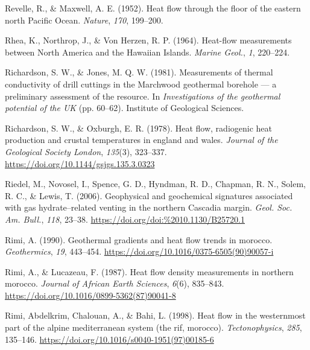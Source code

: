 \documentclass[draft,linenumbers]{agujournal2018}
\begin{document}
\leavevmode{}%
Revelle, R., \& Maxwell, A. E. (1952). Heat flow through the floor of
the eastern north {Pacific Ocean}. \emph{Nature}, \emph{170}, 199--200.

\leavevmode{}%
Rhea, K., Northrop, J., \& Von Herzen, R. P. (1964). Heat-flow
measurements between {North America and the Hawaiian Islands}.
\emph{Marine Geol.}, \emph{1}, 220--224.

\leavevmode{}%
Richardson, S. W., \& Jones, M. Q. W. (1981). Measurements of thermal
conductivity of drill cuttings in the {Marchwood} geothermal borehole
--- a preliminary assessment of the resource. In \emph{Investigations of
the geothermal potential of the UK} (pp. 60--62). Institute of
Geological Sciences.

\leavevmode{}%
Richardson, S. W., \& Oxburgh, E. R. (1978). Heat flow, radiogenic heat
production and crustal temperatures in england and wales. \emph{Journal
of the Geological Society London}, \emph{135}(3), 323--337.
\url{https://doi.org/10.1144/gsjgs.135.3.0323}

\leavevmode{}%
Riedel, M., Novosel, I., Spence, G. D., Hyndman, R. D., Chapman, R. N.,
Solem, R. C., \& Lewis, T. (2006). Geophysical and geochemical
signatures associated with gas {hydrate--related} venting in the
northern {Cascadia} margin. \emph{Geol. Soc. Am. Bull.}, \emph{118},
23--38. \url{https://doi.org/doi:\%2010.1130/B25720.1}

\leavevmode{}%
Rimi, A. (1990). Geothermal gradients and heat flow trends in morocco.
\emph{Geothermics}, \emph{19}, 443--454.
\url{https://doi.org/10.1016/0375-6505(90)90057-i}

\leavevmode{}%
Rimi, A., \& Lucazeau, F. (1987). Heat flow density measurements in
northern morocco. \emph{Journal of African Earth Sciences}, \emph{6}(6),
835--843. \url{https://doi.org/10.1016/0899-5362(87)90041-8}

\leavevmode{}%
Rimi, Abdelkrim, Chalouan, A., \& Bahi, L. (1998). Heat flow in the
westernmost part of the alpine mediterranean system (the rif, morocco).
\emph{Tectonophysics}, \emph{285}, 135--146.
\url{https://doi.org/10.1016/s0040-1951(97)00185-6}
\end{document}
